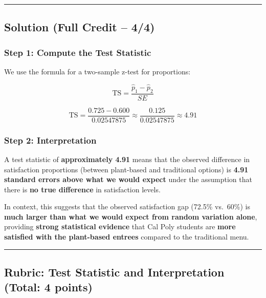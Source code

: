 \documentclass[
  letterpaper,
  DIV=11,
  numbers=noendperiod]{scrartcl}
\begin{document}
\begin{center}\rule{0.5\linewidth}{0.5pt}\end{center}

\hypertarget{solution-full-credit-44}{%
\subsection{\texorpdfstring{\textbf{Solution (Full Credit --
4/4)}}{Solution (Full Credit -- 4/4)}}\label{solution-full-credit-44}}

\hypertarget{step-1-compute-the-test-statistic}{%
\subsubsection{\texorpdfstring{\textbf{Step 1: Compute the Test
Statistic}}{Step 1: Compute the Test Statistic}}\label{step-1-compute-the-test-statistic}}

We use the formula for a two-sample z-test for proportions:

\[
\text{TS} = \frac{\hat{p}_1 - \hat{p}_2}{SE}
\]

\[
\text{TS} = \frac{0.725 - 0.600}{0.02547875} \approx \frac{0.125}{0.02547875} \approx 4.91
\]

\hypertarget{step-2-interpretation}{%
\subsubsection{\texorpdfstring{\textbf{Step 2:
Interpretation}}{Step 2: Interpretation}}\label{step-2-interpretation}}

A test statistic of \textbf{approximately 4.91} means that the observed
difference in satisfaction proportions (between plant-based and
traditional options) is \textbf{4.91 standard errors above what we would
expect} under the assumption that there is \textbf{no true difference}
in satisfaction levels.

In context, this suggests that the observed satisfaction gap (72.5\%
vs.~60\%) is \textbf{much larger than what we would expect from random
variation alone}, providing \textbf{strong statistical evidence} that
Cal Poly students are \textbf{more satisfied with the plant-based
entrees} compared to the traditional menu.

\begin{center}\rule{0.5\linewidth}{0.5pt}\end{center}

\hypertarget{rubric-test-statistic-and-interpretation-total-4-points}{%
\subsection{\texorpdfstring{\textbf{Rubric: Test Statistic and
Interpretation (Total: 4
points)}}{Rubric: Test Statistic and Interpretation (Total: 4 points)}}\label{rubric-test-statistic-and-interpretation-total-4-points}}
\end{document}
